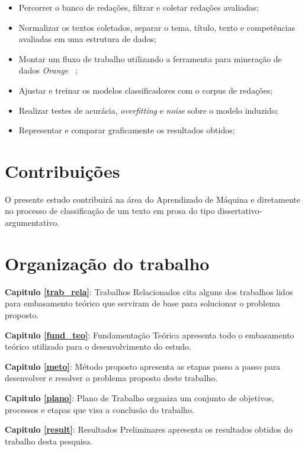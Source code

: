 \begin{itemize}
 \item Percorrer o banco de redações, filtrar e coletar redações avaliadas;
 \item Normalizar os textos coletados, separar o tema, título, texto e competências avaliadas em uma estrutura de dados;
 \item Montar um fluxo de trabalho utilizando a ferramenta para mineração de dados \textit{Orange} ~\cite{JMLR:demsar13a};
 \item Ajustar e treinar os modelos classificadores com o corpus de redações; 
 \item Realizar testes de acurácia, \textit{overfitting} e \textit{noise} sobre o modelo induzido;
 \item Representar e comparar graficamente os resultados obtidos;
\end{itemize}

\section{Contribuições}

O presente estudo contribuirá na área do Aprendizado de Máquina e diretamente no processo de classificação de um texto em prosa do tipo dissertativo-argumentativo.

\section{Organização do trabalho}

\noindent \textbf{Capitulo \ref{trab_rela}}: Trabalhos Relacionados cita alguns dos trabalhos lidos para  embasamento teórico que serviram de base para solucionar o problema proposto.

\noindent \textbf{Capitulo \ref{fund_teo}}: Fundamentação Teórica apresenta todo o embasamento teórico utilizado para o desenvolvimento do estudo.

\noindent \textbf{Capitulo \ref{meto}}: Método proposto apresenta as etapas passo a passo para desenvolver e resolver o problema proposto deste trabalho.

\noindent \textbf{Capitulo \ref{plano}}: Plano de Trabalho organiza um conjunto de objetivos, processos e etapas que visa a conclusão do trabalho.

\noindent \textbf{Capitulo \ref{result}}: Resultados Preliminares apresenta os resultados obtidos do trabalho desta pesquisa.

